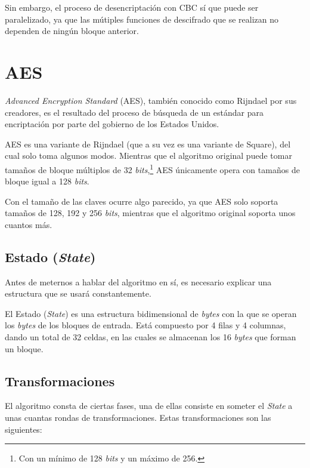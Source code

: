 Sin embargo, el proceso de desencriptación con CBC sí que puede ser paralelizado, ya que las mútiples funciones de descifrado que se realizan no dependen de ningún bloque anterior. \emph{\parencite{Reference24}}


\section{AES}

\label{AES}

\emph{Advanced Encryption Standard} (AES), también conocido como Rijndael por sus creadores, es el resultado del proceso de búsqueda de un estándar para encriptación por parte del gobierno de los Estados Unidos.

AES es una variante de Rijndael (que a su vez es una variante de Square), del cual solo toma algunos modos. Mientras que el algoritmo original puede tomar tamaños de bloque múltiplos de 32 \emph{bits},\footnote{Con un mínimo de 128 \emph{bits} y un máximo de 256.} AES únicamente opera con tamaños de bloque igual a 128 \emph{bits}.

Con el tamaño de las claves ocurre algo parecido, ya que AES solo soporta tamaños de 128, 192 y 256 \emph{bits}, mientras que el algoritmo original soporta unos cuantos más. \emph{\parencite{Reference25}}

\subsection{Estado (\emph{State})}

Antes de meternos a hablar del algoritmo en sí, es necesario explicar una estructura que se usará constantemente.

El Estado (\emph{State}) es una estructura bidimensional de \emph{bytes} con la que se operan los \emph{bytes} de los bloques de entrada. Está compuesto por 4 filas y 4 columnas, dando un total de 32 celdas, en las cuales se almacenan los 16 \emph{bytes} que forman un bloque. \emph{\parencite{Reference26}}

\subsection{Transformaciones}

El algoritmo consta de ciertas fases, una de ellas consiste en someter el \emph{State} a unas cuantas rondas de transformaciones. Estas transformaciones son las siguientes:

